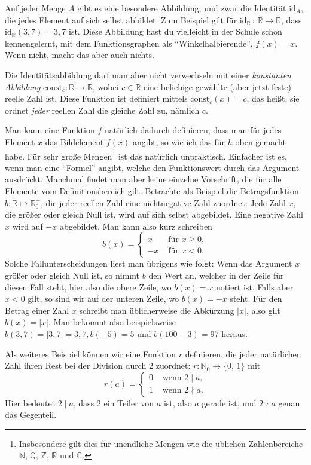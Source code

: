\documentclass[a4paper,ngerman,12pt]{zirkelblatt1415}
\theoremstyle{definition}
\theoremstyle{remark}
\newcommand{\RR}{\mathbb{R}}
\newcommand{\CC}{\mathbb{C}}
\newcommand{\ZZ}{\mathbb{Z}}
\renewcommand{\NN}{\mathbb{N}}
\newcommand{\QQ}{\mathbb{Q}}
\newcommand{\lra}{\longrightarrow}
\newcommand{\id}{\text{id}}
\begin{document}
Auf jeder Menge $A$ gibt es eine besondere Abbildung, und zwar die Identität $\text{id}_A$, die jedes Element auf sich selbst abbildet. 
Zum Beispiel gilt für $\id_{\RR}\, : \, \RR\lra\RR$, dass $\id_{\RR}(3,7)=3,7$ ist. 
Diese Abbildung hast du vielleicht in der Schule schon kennengelernt, mit dem Funktionsgraphen als "`Winkelhalbierende"', $f(x) = x$.
Wenn nicht, macht das aber auch nichts.

Die Identitätsabbildung darf man aber nicht verwechseln mit einer \emph{konstanten Abbildung} $\text{const}_{c}:\RR\lra\RR$, wobei $c\in\RR$ eine beliebige gewählte (aber jetzt feste) reelle Zahl ist. 
Diese Funktion ist definiert mittels $\text{const}_c(x)=c$, das heißt, sie ordnet \emph{jeder} reellen Zahl die gleiche Zahl zu, nämlich $c$.

Man kann eine Funktion $f$ natürlich dadurch definieren, dass man für jedes Element $x$ das Bildelement $f(x)$ angibt,
so wie ich das für $h$ oben gemacht habe.
Für sehr große Mengen\footnote{Insbesondere gilt dies für unendliche Mengen wie die üblichen Zahlenbereiche $\NN$, $\QQ$, $\ZZ$, $\RR$ und $\CC$.} 
ist das natürlich unpraktisch.
Einfacher ist es, wenn man eine "`Formel"' angibt, welche den Funktionswert durch das Argument ausdrückt. 
Manchmal findet man aber keine einzelne Vorschrift, die für alle Elemente vom Definitionsbereich gilt. 
Betrachte als Beispiel die Betragsfunktion $b:\mathbb{R} \mapsto \mathbb{R}^+_0$, die jeder reellen Zahl eine nichtnegative Zahl zuordnet: 
Jede Zahl $x$, die größer oder gleich Null ist, wird auf sich selbst abgebildet. 
Eine negative Zahl $x$ wird auf $-x$ abgebildet. Man kann also kurz schreiben
\[ b(x) =\begin{cases} 
      x & \text{ für }x\geq 0, \\
      -x & \text{ für }x < 0.
   \end{cases}
\]
Solche Fallunterscheidungen liest man übrigens wie folgt: Wenn das Argument $x$ größer oder gleich Null ist, 
so nimmt $b$ den Wert an, welcher in der Zeile für diesen Fall steht, hier also die obere Zeile, wo $b(x)=x$ notiert ist. 
Falls aber $x<0$ gilt, so sind wir auf der unteren Zeile, wo $b(x)=-x$ steht.
Für den Betrag einer Zahl $x$ schreibt man üblicherweise die Abkürzung $|x|$, also gilt $b(x)=|x|$. 
Man bekommt also beispielsweise $b(3,7) = |3,7| = 3,7, b(-5) = 5$ und $b(100-3) = 97$ heraus.


Als weiteres Beispiel können wir eine Funktion $r$ definieren, die jeder natürlichen Zahl ihren Rest bei der Division durch $2$ zuordnet: $r:\mathbb{N}_0 \longrightarrow \{0\text{, }1\}$ mit
\[ r(a) = 
\begin{cases}
0 & \text{ wenn }2\mid a, \\
1 & \text{ wenn }2\nmid a.
\end{cases}
\]
Hier bedeutet $2 \mid a$, dass $2$ ein Teiler von $a$ ist, also $a$ gerade ist, und $2\nmid a$ genau das Gegenteil. 
\end{document}
